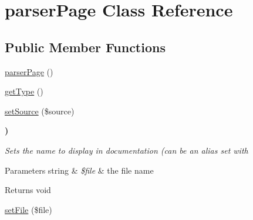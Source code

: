 \hypertarget{classparser_page}{\section{parser\-Page \-Class \-Reference}
\label{classparser_page}
}
\subsection*{\-Public \-Member \-Functions}
\begin{DoxyCompactItemize}
\item 
\hyperlink{classparser_page_a7d633bbbe010cbd2a3c2cd94c848690d}{parser\-Page} ()
\item 
\hyperlink{classparser_page_a830b5c75df72b32396701bc563fbe3c7}{get\-Type} ()
\item 
\hyperlink{classparser_page_a55a8779d4a8f6d2bbec5e6fedf28ef7c}{set\-Source} (\$source)
\end{DoxyCompactItemize}
\begin{Indent}{\bf )}\par
{\em \-Sets the name to display in documentation (can be an alias set with


\begin{DoxyParams}[1]{\-Parameters}
string & {\em \$file} & the file name\\
\hline
\end{DoxyParams}
\begin{DoxyReturn}{\-Returns}
void 
\end{DoxyReturn}
}\begin{DoxyCompactItemize}
\item 
\hyperlink{classparser_page_a786ea2bbab26bd4a0ecae24b253d17fe}{set\-File} (\$file)
\end{DoxyCompactItemize}
\end{Indent}
